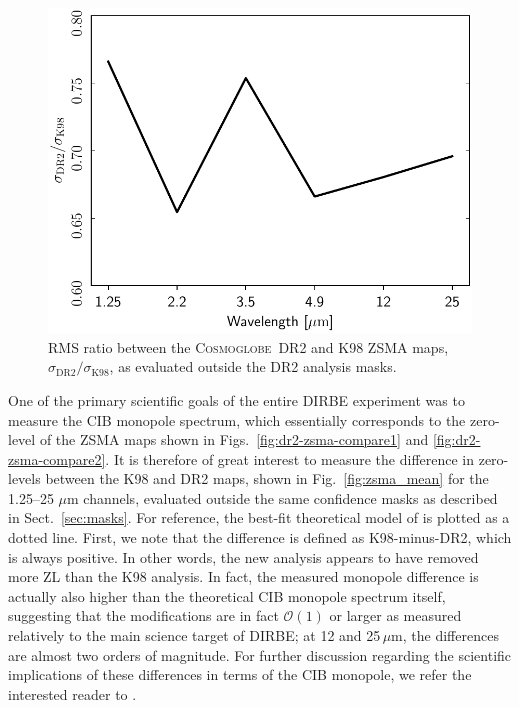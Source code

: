 \documentclass[twocolumn]{aa}
\newcommand{\cosmoglobe}{\textsc{Cosmoglobe}}
\begin{document}
\begin{figure}
    \centering
    \includegraphics[width=\linewidth]{figs/zodi_rms_ratio_DIRBE_DR2_v4.pdf}
    \caption{RMS ratio between the \cosmoglobe\ DR2 and K98 ZSMA maps,
      $\sigma_{\mathrm{DR2}}/\sigma_\mathrm{K98}$, as evaluated
      outside the DR2 analysis masks.}
    \label{fig:zsma_rms}
\end{figure}


One of the primary scientific goals of the entire DIRBE experiment was
to measure the CIB monopole spectrum, which essentially corresponds to
the zero-level of the ZSMA maps shown in
Figs.~\ref{fig:dr2-zsma-compare1} and \ref{fig:dr2-zsma-compare2}. It
is therefore of great interest to measure the difference in
zero-levels between the K98 and DR2 maps, shown in
Fig.~\ref{fig:zsma_mean} for the 1.25--25 $\mu$m channels, evaluated
outside the same confidence masks as described in
Sect.~\ref{sec:masks}. For reference, the best-fit theoretical model
of \citet{finke2022} is plotted as a dotted line. First, we note that
the difference is defined as K98-minus-DR2, which is always
positive. In other words, the new analysis appears to have removed
more ZL than the K98 analysis. In fact, the measured monopole
difference is actually also higher than the theoretical CIB monopole
spectrum itself, suggesting that the modifications are in fact
$\mathcal{O}(1)$ or larger as measured relatively to the main science
target of DIRBE; at 12 and 25$\,\mu$m, the differences are almost two orders of
magnitude. For further discussion regarding the scientific
implications of these differences in terms of the CIB monopole, we
refer the interested reader to \citet{CG02_03}.
\end{document}

